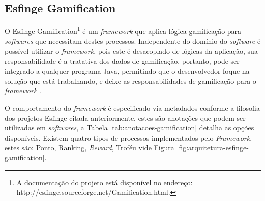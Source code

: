 \subsection{Esfinge Gamification}

\par O Esfinge Gamification\footnote{A documentação do projeto está disponível no endereço: http://esfinge.sourceforge.net/Gamification.html.} é um \textit{framework} que aplica lógica gamificação para \textit{softwares} que necessitam destes processos. Independente do domínio do \textit{software} é possível utilizar o \textit{framework}, pois este é desacoplado de lógicas da aplicação, sua responsabilidade é a tratativa dos dados de gamificação, portanto, pode ser integrado a qualquer programa Java, permitindo que o desenvolvedor foque na solução que está trabalhando, e deixe as responsabilidades de gamificação para o \textit{framework}  .


\par O comportamento do \textit{framework} é especificado via metadados conforme a filosofia dos projetos Esfinge citada anteriormente, estes são anotações que podem ser utilizadas em \textit{softwares}, a Tabela \ref{tab:anotacoes-gamification} detalha as opções disponíveis. Existem quatro tipos de processos implementados pelo \textit{Framework}, estes são: Ponto, Ranking, \textit{Reward}, Troféu vide Figura \ref{fig:arquitetura-esfinge-gamification}.

